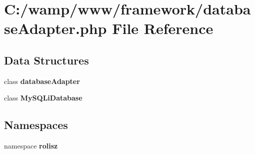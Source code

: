 \section{C:/wamp/www/framework/databaseAdapter.php File Reference}
\label{database_adapter_8php}
\subsection*{Data Structures}
\begin{DoxyCompactItemize}
\item 
class {\bf databaseAdapter}
\item 
class {\bf MySQLiDatabase}
\end{DoxyCompactItemize}
\subsection*{Namespaces}
\begin{DoxyCompactItemize}
\item 
namespace {\bf rolisz}
\end{DoxyCompactItemize}
